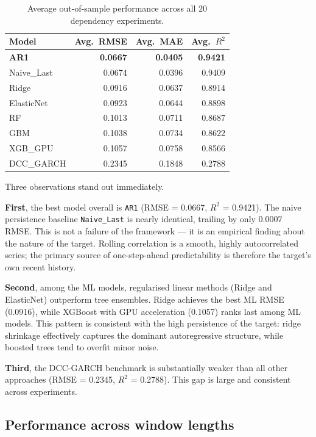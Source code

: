 \documentclass[12pt, a4paper]{article}
\begin{document}
\begin{table}[H]
  \centering
  \caption{Average out-of-sample performance across all 20 dependency experiments.}
  \label{tab:ranking}
  \begin{tabular}{lrrr}
    \toprule
    Model            & Avg.\ RMSE & Avg.\ MAE & Avg.\ $R^2$ \\
    \midrule
    \textbf{AR1}     & \textbf{0.0667} & \textbf{0.0405} & \textbf{0.9421} \\
    Naive\_Last      & 0.0674 & 0.0396 & 0.9409 \\
    Ridge            & 0.0916 & 0.0637 & 0.8914 \\
    ElasticNet       & 0.0923 & 0.0644 & 0.8898 \\
    RF               & 0.1013 & 0.0711 & 0.8687 \\
    GBM              & 0.1038 & 0.0734 & 0.8622 \\
    XGB\_GPU         & 0.1057 & 0.0758 & 0.8566 \\
    \midrule
    DCC\_GARCH       & 0.2345 & 0.1848 & 0.2788 \\
    \bottomrule
  \end{tabular}
\end{table}

Three observations stand out immediately.

\textbf{First}, the best model overall is \texttt{AR1}
(RMSE = 0.0667, $R^2$ = 0.9421).
The naive persistence baseline \texttt{Naive\_Last} is nearly
identical, trailing by only 0.0007 RMSE.
This is not a failure of the framework — it is an empirical
finding about the nature of the target.
Rolling correlation is a smooth, highly autocorrelated series;
the primary source of one-step-ahead predictability is therefore
the target's own recent history.

\textbf{Second}, among the ML models, regularised linear methods
(Ridge and ElasticNet) outperform tree ensembles.
Ridge achieves the best ML RMSE (0.0916), while XGBoost
with GPU acceleration (0.1057) ranks last among ML models.
This pattern is consistent with the high persistence of the target:
ridge shrinkage effectively captures the dominant autoregressive
structure, while boosted trees tend to overfit minor noise.

\textbf{Third}, the DCC-GARCH benchmark is substantially weaker
than all other approaches (RMSE = 0.2345, $R^2$ = 0.2788).
This gap is large and consistent across experiments.

\subsection{Performance across window lengths}
\end{document}
